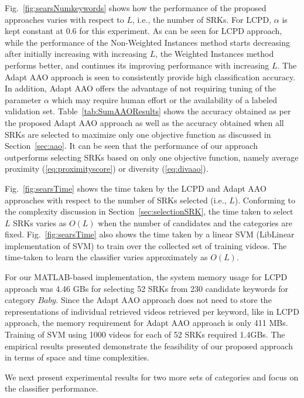 Fig.~\ref{fig:searsNumkeywords} shows how the performance of the proposed approaches varies with respect to $L$, i.e., the number of SRKs. For LCPD, $\alpha$ is kept constant at $0.6$ for this experiment. As can be seen for LCPD approach, while the performance of the Non-Weighted Instances method starts decreasing after initially increasing with increasing $L$, the Weighted Instances method performs better, and continues its improving performance with increasing $L$. The Adapt AAO approach is seen to consistently provide high classification accuracy. In addition, Adapt AAO offers the advantage of not requiring tuning of the parameter $\alpha$ which may require human effort or the availability of a labeled validation set. Table~\ref{tab:SumAAOResults} shows the accuracy obtained as per the proposed Adapt AAO approach as well as the accuracy obtained when all SRKs are selected to maximize only one objective function as discussed in Section~\ref{sec:aao}. It can be seen that the performance of our approach outperforms selecting SRKs based on only one objective function, namely average proximity (\ref{eq:proximityscore}) or diversity (\ref{eq:divaao}). 

Fig.~\ref{fig:searsTime} shows the time taken by the LCPD and Adapt AAO approaches with respect to the number of SRKs selected (i.e., $L$). Conforming to the complexity discussion in Section~\ref{sec:selectionSRK}, the time taken to select $L$ SRKs varies as $O(L)$ when the number of candidates and the categories are fixed. Fig.~\ref{fig:searsTime} also shows the time taken by a linear SVM (LibLinear implementation of SVM) to train over the collected set of training videos. The time-taken to learn the classifier varies approximately as $O(L)$. 

For our MATLAB-based implementation, the system memory usage for LCPD approach was 4.46 GBs for selecting 52 SRKs from 230 candidate keywords for category $Baby$. Since the Adapt AAO approach does not need to store the representations of individual retrieved videos retrieved per keyword, like in LCPD approach, the memory requirement for Adapt AAO approach is only 411 MBs. Training of SVM using 1000 videos for each of 52 SRKs required 1.4GBs. The empirical results presented demonstrate the feasibility of our proposed approach in terms of space and time complexities. 

We next present experimental results for two more sets of categories and focus on the classifier performance. 

